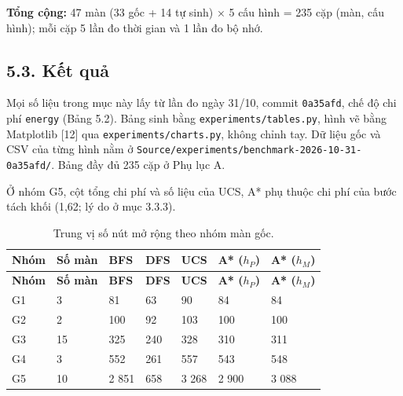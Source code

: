 \textbf{Tổng cộng:} 47 màn (33 gốc + 14 tự sinh) × 5 cấu hình = 235 cặp (màn, cấu hình); mỗi cặp 5 lần đo thời gian và 1 lần đo bộ nhớ.

\subsection{5.3. Kết quả}

Mọi số liệu trong mục này lấy từ lần đo ngày 31/10, commit \texttt{0a35afd}, chế độ chi phí \texttt{energy} (Bảng 5.2). Bảng sinh bằng \texttt{experiments/\allowbreak{}tables.\allowbreak{}py}, hình vẽ bằng Matplotlib {[}12{]} qua \texttt{experiments/\allowbreak{}charts.\allowbreak{}py}, không chỉnh tay. Dữ liệu gốc và CSV của từng hình nằm ở \texttt{Source/\allowbreak{}experiments/\allowbreak{}benchmark-\allowbreak{}2026-\allowbreak{}10-\allowbreak{}31-\allowbreak{}0a35afd/\allowbreak{}}. Bảng đầy đủ 235 cặp ở Phụ lục A.

Ở nhóm G5, cột tổng chi phí và số liệu của UCS, A* phụ thuộc chi phí của bước tách khối (1,62; lý do ở mục 3.3.3).

\begin{longtable}[]{@{}lllllll@{}}
\caption{ Trung vị số nút mở rộng theo nhóm màn gốc.}\tabularnewline
\toprule\noalign{}
\rowcolor{tablehead}\textbf{Nhóm} & \textbf{Số màn} & \textbf{BFS} & \textbf{DFS} & \textbf{UCS} & \textbf{A* (\(h_P\))} & \textbf{A* (\(h_M\))} \\
\midrule\noalign{}
\endfirsthead
\toprule\noalign{}
\rowcolor{tablehead}\textbf{Nhóm} & \textbf{Số màn} & \textbf{BFS} & \textbf{DFS} & \textbf{UCS} & \textbf{A* (\(h_P\))} & \textbf{A* (\(h_M\))} \\
\midrule\noalign{}
\endhead
\bottomrule\noalign{}
\endlastfoot
G1 & 3 & 81 & 63 & 90 & 84 & 84 \\
G2 & 2 & 100 & 92 & 103 & 100 & 100 \\
G3 & 15 & 325 & 240 & 328 & 310 & 311 \\
G4 & 3 & 552 & 261 & 557 & 543 & 548 \\
G5 & 10 & 2 851 & 658 & 3 268 & 2 900 & 3 088 \\
\end{longtable}

